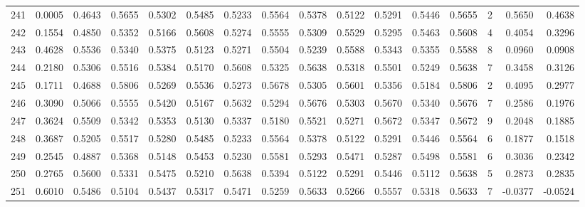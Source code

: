\begin{tabular}{lrrrrrrrrrrrrrrr}
241 &      0.0005 &  0.4643 &  0.5655 &  0.5302 &  0.5485 &  0.5233 &  0.5564 &  0.5378 &  0.5122 &  0.5291 &   0.5446 &     0.5655 &      2 &                    0.5650 &                     0.4638 \\
242 &      0.1554 &  0.4850 &  0.5352 &  0.5166 &  0.5608 &  0.5274 &  0.5555 &  0.5309 &  0.5529 &  0.5295 &   0.5463 &     0.5608 &      4 &                    0.4054 &                     0.3296 \\
243 &      0.4628 &  0.5536 &  0.5340 &  0.5375 &  0.5123 &  0.5271 &  0.5504 &  0.5239 &  0.5588 &  0.5343 &   0.5355 &     0.5588 &      8 &                    0.0960 &                     0.0908 \\
244 &      0.2180 &  0.5306 &  0.5516 &  0.5384 &  0.5170 &  0.5608 &  0.5325 &  0.5638 &  0.5318 &  0.5501 &   0.5249 &     0.5638 &      7 &                    0.3458 &                     0.3126 \\
245 &      0.1711 &  0.4688 &  0.5806 &  0.5269 &  0.5536 &  0.5273 &  0.5678 &  0.5305 &  0.5601 &  0.5356 &   0.5184 &     0.5806 &      2 &                    0.4095 &                     0.2977 \\
246 &      0.3090 &  0.5066 &  0.5555 &  0.5420 &  0.5167 &  0.5632 &  0.5294 &  0.5676 &  0.5303 &  0.5670 &   0.5340 &     0.5676 &      7 &                    0.2586 &                     0.1976 \\
247 &      0.3624 &  0.5509 &  0.5342 &  0.5353 &  0.5130 &  0.5337 &  0.5180 &  0.5521 &  0.5271 &  0.5672 &   0.5347 &     0.5672 &      9 &                    0.2048 &                     0.1885 \\
248 &      0.3687 &  0.5205 &  0.5517 &  0.5280 &  0.5485 &  0.5233 &  0.5564 &  0.5378 &  0.5122 &  0.5291 &   0.5446 &     0.5564 &      6 &                    0.1877 &                     0.1518 \\
249 &      0.2545 &  0.4887 &  0.5368 &  0.5148 &  0.5453 &  0.5230 &  0.5581 &  0.5293 &  0.5471 &  0.5287 &   0.5498 &     0.5581 &      6 &                    0.3036 &                     0.2342 \\
250 &      0.2765 &  0.5600 &  0.5331 &  0.5475 &  0.5210 &  0.5638 &  0.5394 &  0.5122 &  0.5291 &  0.5446 &   0.5112 &     0.5638 &      5 &                    0.2873 &                     0.2835 \\
251 &      0.6010 &  0.5486 &  0.5104 &  0.5437 &  0.5317 &  0.5471 &  0.5259 &  0.5633 &  0.5266 &  0.5557 &   0.5318 &     0.5633 &      7 &                   -0.0377 &                    -0.0524 \\

\end{tabular}
